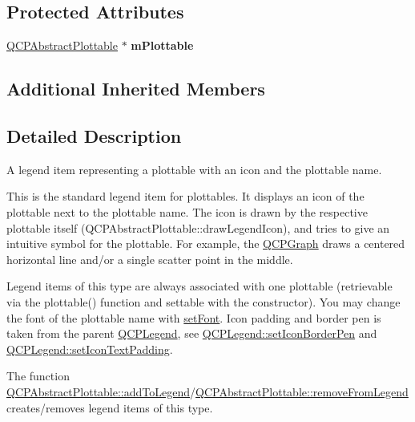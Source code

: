 \subsection*{Protected Attributes}
\begin{DoxyCompactItemize}
\item 
\hyperlink{classQCPAbstractPlottable}{Q\+C\+P\+Abstract\+Plottable} $\ast$ {\bfseries m\+Plottable}\hypertarget{classQCPPlottableLegendItem_ada647fb4b22971a1a424e15b4f6af0d9}{}\label{classQCPPlottableLegendItem_ada647fb4b22971a1a424e15b4f6af0d9}

\end{DoxyCompactItemize}
\subsection*{Additional Inherited Members}


\subsection{Detailed Description}
A legend item representing a plottable with an icon and the plottable name. 

This is the standard legend item for plottables. It displays an icon of the plottable next to the plottable name. The icon is drawn by the respective plottable itself (Q\+C\+P\+Abstract\+Plottable\+::draw\+Legend\+Icon), and tries to give an intuitive symbol for the plottable. For example, the \hyperlink{classQCPGraph}{Q\+C\+P\+Graph} draws a centered horizontal line and/or a single scatter point in the middle.

Legend items of this type are always associated with one plottable (retrievable via the plottable() function and settable with the constructor). You may change the font of the plottable name with \hyperlink{classQCPAbstractLegendItem_a409c53455d8112f71d70c0c43eb10265}{set\+Font}. Icon padding and border pen is taken from the parent \hyperlink{classQCPLegend}{Q\+C\+P\+Legend}, see \hyperlink{classQCPLegend_a2f2c93d18a651f4ff294bb3f026f49b8}{Q\+C\+P\+Legend\+::set\+Icon\+Border\+Pen} and \hyperlink{classQCPLegend_a62973bd69d5155e8ea3141366e8968f6}{Q\+C\+P\+Legend\+::set\+Icon\+Text\+Padding}.

The function \hyperlink{classQCPAbstractPlottable_aa64e93cb5b606d8110d2cc0a349bb30f}{Q\+C\+P\+Abstract\+Plottable\+::add\+To\+Legend}/\hyperlink{classQCPAbstractPlottable_a26d936d11852ea08e6bc0edae3a514a2}{Q\+C\+P\+Abstract\+Plottable\+::remove\+From\+Legend} creates/removes legend items of this type.

